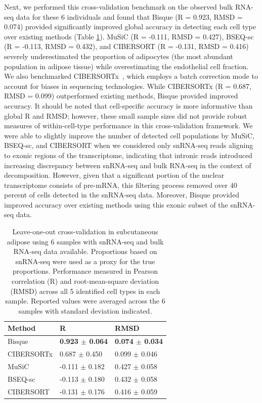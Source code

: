 	 	 	
Next, we performed this cross-validation benchmark on the observed bulk RNA-seq data for these 6 individuals and found that Bisque (R = 0.923, RMSD = 0.074) provided significantly improved global accuracy in detecting each cell type over existing methods (Table \ref{table:table2.2}). MuSiC (R = -0.111, RMSD = 0.427), BSEQ-sc (R = -0.113, RMSD = 0.432), and CIBERSORT (R = -0.131, RMSD = 0.416) severely underestimated the proportion of adipocytes (the most abundant population in adipose tissue) while overestimating the endothelial cell fraction. We also benchmarked CIBERSORTx~\cite{Newman2019-mq}, which employs a batch correction mode to account for biases in sequencing technologies. While CIBERSORTx (R = 0.687, RMSD = 0.099) outperformed existing methods, Bisque provided improved accuracy. It should be noted that cell-specific accuracy is more informative than global R and RMSD; however, these small sample sizes did not provide robust measures of within-cell-type performance in this cross-validation framework. We were able to slightly improve the number of detected cell populations by MuSiC, BSEQ-sc, and CIBERSORT when we considered only snRNA-seq reads aligning to exonic regions of the transcriptome, indicating that intronic reads introduced increasing discrepancy between snRNA-seq and bulk RNA-seq in the context of decomposition. However, given that a significant portion of the nuclear transcriptome consists of pre-mRNA, this filtering process removed over 40 percent of cells detected in the snRNA-seq data. Moreover, Bisque provided improved accuracy over existing methods using this exonic subset of the snRNA-seq data.
\begin{table}
    \scriptsize
    \centering
    \begin{tabular}{|p{3cm}|p{3cm}|p{3cm}|}
    \hline
    \rowcolor{mygray}
    \textbf{Method} & \textbf{R} & \textbf{RMSD} \\ \hline
    Bisque & \textbf{0.923 $\pm$ 0.064} & \textbf{0.074 $\pm$ 0.034} \\ \hline
    CIBERSORTx & 0.687 $\pm$ 0.450 & 0.099 $\pm$ 0.046 \\ \hline
    MuSiC & -0.111 $\pm$ 0.182 & 0.427 $\pm$ 0.058 \\ \hline
    BSEQ-sc & -0.113 $\pm$ 0.180 & 0.432 $\pm$ 0.058  \\ \hline
    CIBERSORT & -0.131 $\pm$ 0.176 & 0.416 $\pm$ 0.059  \\ \hline
    \end{tabular} 
    \captionsetup{justification=raggedright,singlelinecheck=false}
    \caption{
        Leave-one-out cross-validation in subcutaneous adipose using 6 samples with snRNA-seq and bulk RNA-seq data available. Proportions based on snRNA-seq were used as a proxy for the true proportions. Performance measured in Pearson correlation (R) and root-mean-square deviation (RMSD) across all 5 identified cell types in each sample. Reported values were averaged across the 6 samples with standard deviation indicated.
        }
    \label{table:table2.2}
\end{table}


